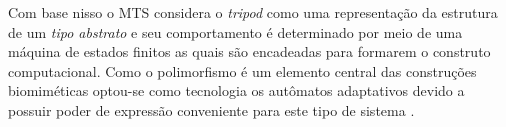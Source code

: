 
Com base nisso o MTS considera o \textit{tripod} como uma representação da estrutura de um \emph{tipo abstrato} e seu comportamento é determinado por meio de uma máquina de estados finitos as quais são encadeadas para formarem o construto computacional. Como o polimorfismo é um elemento central das construções biomiméticas optou-se como tecnologia os autômatos adaptativos devido a possuir poder de expressão conveniente para este tipo de sistema \cite{italo}.
